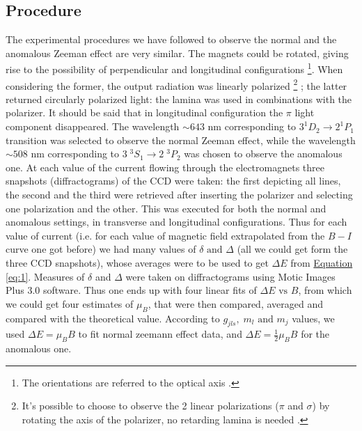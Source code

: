 \documentclass[a4paper,12pt,abstracton]{scrartcl}
\begin{document}
\subsection{Procedure} \label{subsec:procedure}
The experimental procedures we have followed to observe the normal and the anomalous Zeeman effect are very similar. The magnets could be rotated, giving rise to the possibility of perpendicular and longitudinal configurations \footnote{The orientations are referred to the optical axis .}. When considering the former, the output radiation was linearly polarized \footnote{It's possible to choose to observe the 2 linear polarizations ($\pi$ and $\sigma$) by rotating the axis of the polarizer, no retarding lamina is needed .} ; the latter returned circularly polarized light: the lamina was used in combinations with the polarizer. It should be said that in longitudinal configuration the $\pi$ light component disappeared.\newline
The wavelength $\sim 643$ nm corresponding to $3 ^{1}D_{2} \longrightarrow 2 ^{1}P_{1}$  transition was selected to observe the normal Zeeman effect, while the wavelength $\sim 508$ nm corresponding to $3\; ^3S_1 \longrightarrow 2\;^{3}P_2$ was chosen to observe the anomalous one. \newline
At each value of the current flowing through the electromagnets three snapshots (diffractograms) of the CCD were taken: the first depicting all lines, the second and the third were retrieved after inserting the polarizer and selecting one polarization and the other. This was executed for both the normal and anomalous settings, in transverse and longitudinal configurations.\newline
Thus for each value of current (i.e. for each value of magnetic field extrapolated from the $B-I$ curve one got before) we had many values of $\delta \text{ and } \Delta $ (all we could get form the three CCD snapshots), whose averages were to be used to get $\Delta E$ from \hyperref[eq:1]{Equation \ref*{eq:1}}. 
Measures of $\delta$ and $\Delta$ were taken on diffractograms using Motic Images Plus 3.0 software. Thus one ends up with four linear fits of $\Delta E \text{ vs } B$, from which we could get four estimates of $\mu_B$, that were then compared, averaged and compared with the theoretical value. According to $g_{jls} , \; m_l \text{ and } m_j$ values, we used $\Delta E = \mu_B B$ to fit normal zeemann effect data, and $\Delta E =\frac{1}{2} \mu_B B$ for the anomalous one.
\end{document}
